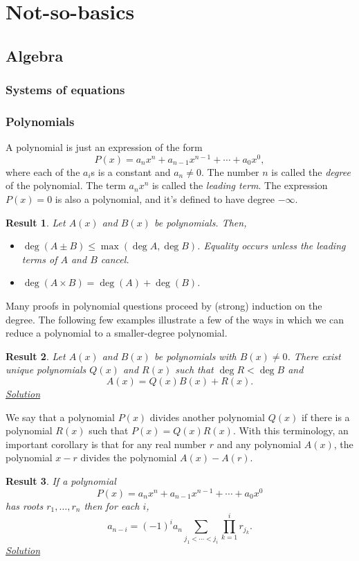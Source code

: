 \documentclass{amsart}
\newtheorem{result}{Result}[subsubsection]
\begin{document}
\section{Not-so-basics}
\subsection{Algebra}
\subsubsection{Systems of equations}\label{n:a:systems}
\subsubsection{Polynomials}
A polynomial is just an expression of the form
\[P(x)=a_n x^n+a_{n-1}x^{n-1}+\cdots+a_0x^0,\] where each of the $a_i$s is a
constant and $a_n\ne 0$.
The number $n$ is called the \emph{degree} of the polynomial. The term $a_n x^n$
is called the \emph{leading term}. The expression
$P(x)=0$ is also a polynomial, and it's defined to have degree $-\infty$.

\begin{result}\label{r:n:a:polys:1}
  Let $A(x)$ and $B(x)$ be polynomials. Then,
  \begin{itemize}
    \item $\deg(A\pm B)\le\max(\deg A,\deg B)$. Equality occurs unless the
      leading terms of $A$ and $B$ cancel.
    \item $\deg(A\times B)=\deg(A)+\deg(B)$.
  \end{itemize}
\end{result}

Many proofs in polynomial questions proceed by (strong) induction on the degree. The
following few examples illustrate a few of the ways in which we can reduce a
polynomial to a smaller-degree polynomial.

\begin{result}\label{r:n:a:polys:2}
  Let $A(x)$ and $B(x)$ be polynomials with $B(x)\ne 0$. There exist unique
  polynomials $Q(x)$ and $R(x)$ such that $\deg R<\deg B$ and
  \[A(x)=Q(x)B(x)+R(x).\]
  \hyperlink{sr:n:a:polys:2}{Solution}
\end{result}
We say that a polynomial $P(x)$ divides another polynomial $Q(x)$ if there is a
polynomial $R(x)$ such that $P(x)=Q(x)R(x)$.
With this terminology, an important corollary is that for any real number $r$ and any polynomial
$A(x)$, the polynomial $x-r$ divides the polynomial $A(x)-A(r)$.
\begin{result}\label{r:n:a:polys:3}
  If a polynomial \[P(x)=a_n x^n+a_{n-1}x^{n-1}+\cdots+a_0x^0\] has roots
  $r_1,\ldots,r_n$ then for each $i$, \[a_{n-i}=(-1)^i a_n
  \sum_{j_1<\cdots<j_i} \prod_{k=1}^i r_{j_k}.\]
  \hyperlink{sr:n:a:polys:3}{Solution}
\end{result}
\end{document}
